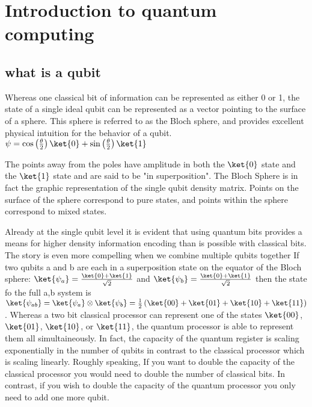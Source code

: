 \chapter{Introduction to quantum computing}
\section{what is a qubit}

Whereas one classical bit of information can be represented as either 0 or 1, the state of a single ideal qubit can be represented as a vector pointing to the surface of a sphere.
This sphere is referred to as the Bloch sphere, and provides excellent physical intuition for the behavior of a qubit.
{
}
{}
$\psi = \cos \left( \frac{\theta}{2} \right) \ket{0} + \sin \left( \frac{\theta}{2} \right)\ket{1} $

The points away from the poles have amplitude in both the $\ket{0}$ state and the $\ket{1}$ state and are said to be "in superposition".
The Bloch Sphere is in fact the graphic representation of the single qubit density matrix.
Points on the surface of the sphere correspond to pure states, and points within the sphere correspond to mixed states.

Already at the single qubit level it is evident that using quantum bits provides a means for higher density information encoding than is possible with classical bits.
The story is even more compelling when we combine multiple qubits together
If two qubits a and b are each in a superposition state on the equator of the Bloch sphere:
$\ket{\psi_a} = \frac{\ket{0}+\ket{1}}{\sqrt{2}}$ and $\ket{\psi_b} = \frac{\ket{0}+\ket{1}}{\sqrt{2}}$
then the state fo the full a,b system is
$\ket{\psi_{ab}} = \ket{\psi_a} \otimes \ket{\psi_b} = \frac{1}{2} \left( \ket{00} + \ket{01} + \ket{10} + \ket{11} \right)$.
Whereas a two bit classical processor can represent one of the states $\ket{00}$, $\ket{01}$, $\ket{10}$, or $\ket{11}$, the quantum processor is able to represent them all simultaineously.
In fact, the capacity of the quantum register is scaling exponentially in the number of qubits in contrast to the classical processor which is scaling linearly.
Roughly speaking, If you want to double the capacity of the classical processor you would need to double the number of classical bits.
In contrast, if you wish to double the capacity of the quantum processor you only need to add one more qubit.

